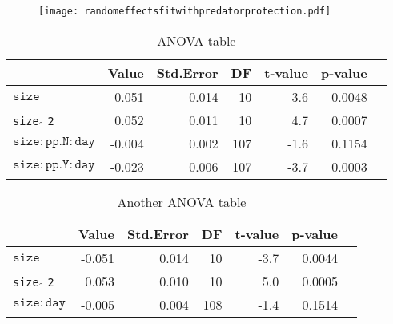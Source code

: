 \documentclass[12pt]{ecologyFORAPPENDIX}
\newcommand{\processfloatnow}{
	\begingroup
	\let\cleardoublepage\relax
	\let\clearpage\relax
	\processdelayedfloats
	\endgroup
}
\begin{document}
\begin{figure}
\texttt{[image: randomeffectsfitwithpredatorprotection.pdf]}
\caption{}
\label{fig:randomeffectsfitwithpredatorprotection}
\end{figure}
\processfloatnow

\singlespace
\begin{table}
\caption{ANOVA table}
\begin{tabular}{lrrrrrr}
\hline
                              & Value  & Std.Error & DF  & t-value & p-value \\
\hline
$\mathtt{size}$ 		      & -0.051& 0.014 	& 10   & -3.6 & 0.0048 \\
\texttt{size}  $\hat{}$ \texttt{2} 	      & 0.052 & 0.011  & 10   & 4.7  & 0.0007 \\
$\mathtt{size:pp.N:day}$& -0.004 & 0.002 & 107 & -1.6 & 0.1154 \\
$\mathtt{size:pp.Y:day}$ & -0.023 & 0.006 & 107 & -3.7 & 0.0003 \\
\hline
\end{tabular}
\end{table}
\processfloatnow
\doublespace


\singlespace
\begin{table}
\caption{Another ANOVA table}
\begin{tabular}{lrrrrrr}
\hline
                              & Value  & Std.Error & DF  & t-value & p-value \\
\hline
$\mathtt{size}$ 		      & -0.051& 0.014 	& 10   & -3.7 & 0.0044 \\
\texttt{size}  $\hat{}$ \texttt{2} 	      & 0.053 & 0.010  & 10   & 5.0  & 0.0005 \\
$\mathtt{size:day}$ & -0.005 & 0.004 & 108 & -1.4 & 0.1514 \\
\hline
\end{tabular}
\end{table}
\processfloatnow
\doublespace



\end{document}
